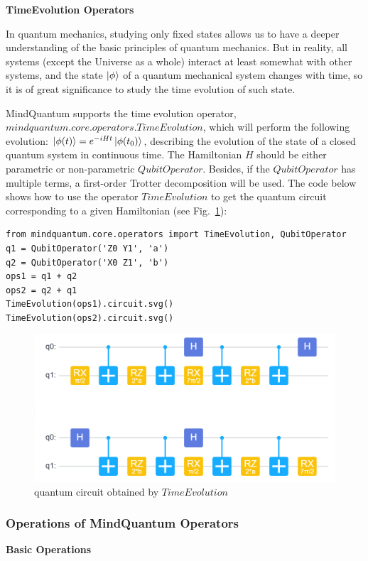 \textbf{TimeEvolution Operators}

In quantum mechanics, studying only fixed states allows us to have a deeper understanding of the basic principles of quantum mechanics. But in reality, all systems (except the Universe as a whole) interact at least somewhat with other systems, and the state $\ket{\phi}$ of a quantum mechanical system changes with time, so it is of great significance to study the time evolution of such state.

MindQuantum supports the time evolution operator, $mindquantum.core.operators.TimeEvolution$, which will perform the following evolution: $\ket{\phi(t)} = e^{-iHt}\ket{\phi(t_0)}$, describing the evolution of the state of a closed quantum system in continuous time. The Hamiltonian $H$ should be either parametric or non-parametric $QubitOperator$. Besides, if the $QubitOperator$ has multiple terms, a first-order Trotter decomposition will be used. The code below shows how to use the operator $TimeEvolution$ to get the quantum circuit corresponding to a given Hamiltonian (see Fig.~\ref{2.5_TimeEvolution_circuit}):
\begin{lstlisting}
from mindquantum.core.operators import TimeEvolution, QubitOperator
q1 = QubitOperator('Z0 Y1', 'a')
q2 = QubitOperator('X0 Z1', 'b')
ops1 = q1 + q2
ops2 = q2 + q1
TimeEvolution(ops1).circuit.svg()
TimeEvolution(ops2).circuit.svg()
\end{lstlisting}
\begin{figure}[h]
    \centering
    \includegraphics[width=0.7\linewidth]{2.5_figures/2.5_TimeEvolution_circuit.png}
    \caption{quantum circuit obtained by $TimeEvolution$}
    \label{2.5_TimeEvolution_circuit}
\end{figure}


\subsubsection{Operations of MindQuantum Operators}

\textbf{Basic Operations}

